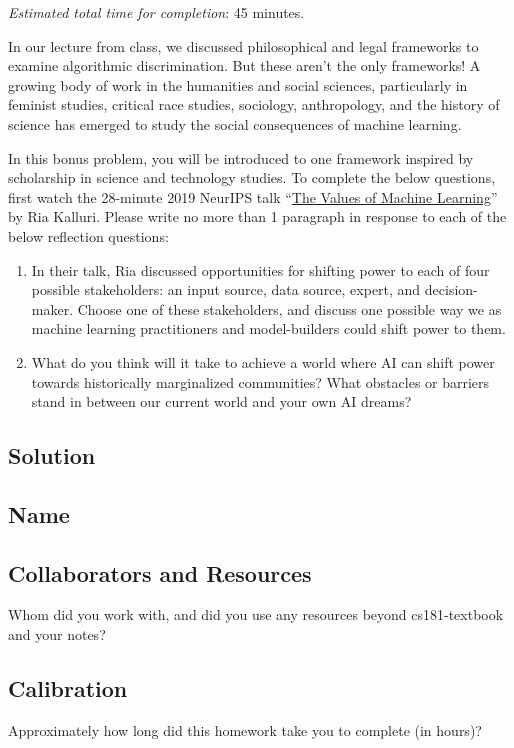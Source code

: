 \documentclass[submit]{harvardml}
\begin{document}
\begin{problem}
\emph{Estimated total time for completion}: 45 minutes.

In our lecture from class, we discussed philosophical and legal frameworks to examine algorithmic discrimination.  But these aren't the only frameworks!  A growing body of work in the humanities and social sciences, particularly in feminist studies, critical race studies, sociology, anthropology, and the history of science has emerged to study the social consequences of machine learning.

In this bonus problem, you will be introduced to one framework inspired by scholarship in science and technology studies.  To complete the below questions, first watch the 28-minute 2019 NeurIPS talk ``\href{https://slideslive.com/38923453/the-values-of-machine-learning}{The Values of Machine Learning}'' by Ria Kalluri.  Please write no more than 1 paragraph in response to each of the below reflection questions:

\begin{enumerate}
    \item In their talk, Ria discussed opportunities for shifting power to each of four possible stakeholders: an input source, data source, expert, and decision-maker.  Choose one of these stakeholders, and discuss one possible way we as machine learning practitioners and model-builders could shift power to them.
    \item What do you think will it take to achieve a world where AI can shift power towards historically marginalized communities?  What obstacles or barriers stand in between our current world and your own AI dreams?
\end{enumerate}

\end{problem}


\subsection*{Solution}

\newpage
\subsection*{Name}

\subsection*{Collaborators and Resources}
Whom did you work with, and did you use any resources beyond cs181-textbook and your notes?

\subsection*{Calibration}
Approximately how long did this homework take you to complete (in hours)? 
\end{document}
